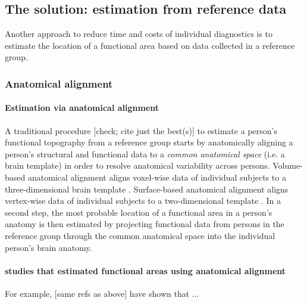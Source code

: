 \subsection{The solution: estimation from reference data}

Another approach to reduce time and costs of individual diagnostics is to
estimate the location of a functional area based on data collected in a
reference group.


\subsubsection{Anatomical alignment}


\paragraph{Estimation via anatomical alignment}
%
A traditional procedure \citep{frost2012measuring, weiner2018defining,
zhen2017quantifying, zhen2015quantifying, rosenke2021probabilistic,
wang2015probabilistic} [check; cite just the best(s)] to estimate a person's
functional topography from a reference group starts by anatomically aligning a
person's structural and functional data to a \textit{common anatomical space}
(i.e. a brain template) in order to resolve anatomical variability across
persons.
Volume-based anatomical alignment \citep[s.][for a review]{klein2009evaluation}
aligns voxel-wise data of individual subjects to a three-dimensional brain
template \citep[e.g., MNI152 template;][]{fonov2011unbiased}.
Surface-based anatomical alignment \citep{fischl1999cortical} aligns vertex-wise
data of individual subjects to a two-dimensional template \citep[e.g.,
FreeSurfer fsaverage template;][]{fischl1999high}.
In a second step, the most probable location of a functional area in a person's
anatomy is then estimated by projecting functional data from persons in the
reference group through the common anatomical space into the individual person's
brain anatomy.


\paragraph{studies that estimated functional areas using anatomical alignment}


For example,  \citep{frost2012measuring, weiner2018defining,
zhen2017quantifying, zhen2015quantifying, rosenke2021probabilistic,
wang2015probabilistic} [same refs as above] have shown that ...

